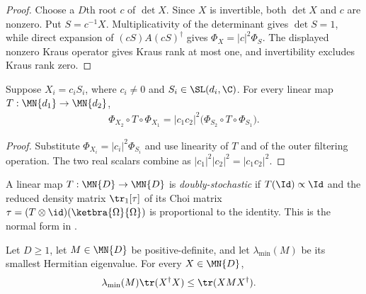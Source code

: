 \begin{proof}\leanok
    Choose a $D$th root $c$ of $\det X$.  Since $X$ is invertible, both
    $\det X$ and $c$ are nonzero.  Put $S=c^{-1}X$.  Multiplicativity of the
    determinant gives $\det S=1$, while direct expansion of
    $(cS)A(cS)^\dagger$ gives
    $\Phi_X=|c|^2\Phi_S$.  The displayed nonzero Kraus operator gives Kraus
    rank at most one, and invertibility excludes Kraus rank zero.
\end{proof}

\begin{lemma}
\label{lem:invertible_filter_two_scalar}
    \leanok
    Suppose $X_i=c_iS_i$, where $c_i\neq0$ and
    $S_i\in\SL(d_i,\C)$.  For every linear map
    $T:\MN{d_1}\to\MN{d_2}$,
    \begin{align}
        \Phi_{X_2}\circ T\circ\Phi_{X_1}
        =|c_1c_2|^2
          \bigl(\Phi_{S_2}\circ T\circ\Phi_{S_1}\bigr).
        \label{eq:representations_filter_two_scalar}
    \end{align}
\end{lemma}

\begin{proof}\leanok
    Substitute $\Phi_{X_i}=|c_i|^2\Phi_{S_i}$ and use linearity of $T$ and
    of the outer filtering operation.  The two real scalars combine as
    $|c_1|^2|c_2|^2=|c_1c_2|^2$.
\end{proof}

\begin{definition}\label{def:doubly_stochastic}
    \leanok
    A linear map $T : \MN{D} \to \MN{D}$ is \emph{doubly-stochastic}
    if $T(\Id)\propto\Id$ and the reduced density matrix
    $\tr_{1}[\tau]$ of its Choi matrix
    $\tau=(T\otimes\id)(\ketbra{\Omega}{\Omega})$
    is proportional to the identity. This is the normal form in
    \cite[Proposition~2.9]{Wolf2012Quantum}.
\end{definition}

\begin{lemma}\label{lem:posdef_trace_lower_bound}
    \leanok
    Let $D\geq1$, let $M\in\MN{D}$ be positive-definite, and let
    $\lambda_{\min}(M)$ be its smallest Hermitian eigenvalue. For every
    $X\in\MN{D}$,
    \begin{align}
        \lambda_{\min}(M)\tr(X^{\dagger}X)
        &\leq \tr(XMX^{\dagger}).
        \label{eq:representations_posdef_trace_bound}
    \end{align}
\end{lemma}


